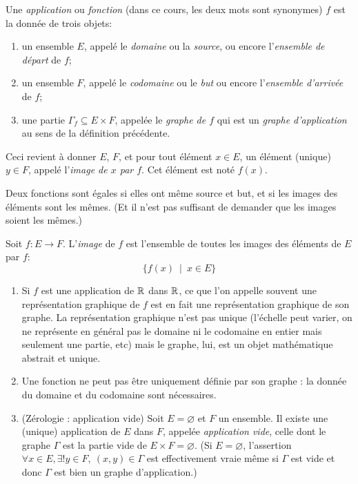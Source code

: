 \begin{definition}
Une \emph{application} ou \emph{fonction} (dans ce cours, les deux mots sont synonymes) $f$ est la donnée de trois objets:
\begin{enumerate}
\item un ensemble $E$, appelé le \emph{domaine} ou la \emph{source}, ou encore l'\emph{ensemble de départ} de $f$;
\item un ensemble $F$, appelé le \emph{codomaine} ou le \emph{but} ou encore l'\emph{ensemble d'arrivée} de $f$;
\item une partie $\Gamma_f \subseteq E\times F$, appelée le \emph{graphe de $f$} qui est un \emph{graphe d'application} au sens de la définition précédente. 
\end{enumerate}
Ceci revient à donner $E$, $F$, et pour tout élément $x \in E$, un élément (unique) $y\in F$, appelé l'\emph{image de $x$ par $f$}. Cet élément est noté $f(x)$.
\end{definition}

Deux fonctions sont égales si elles ont même source et but, et si les images des éléments sont les mêmes. (Et il n'est pas suffisant de demander que les images soient les mêmes.)

\begin{definition}
Soit $f : E\to F$. L'\emph{image} de $f$ est l'ensemble de toutes les images des éléments de $E$ par $f$:
\[
\{f(x)\:\mid\: x\in E\}
\]
\end{definition}

\begin{remarque}
\begin{enumerate}
\item Si $f$ est une application de $\mathbb{R}$ dans $\mathbb{R}$, ce que l'on appelle souvent une \og représentation graphique de $f$\fg{} est en fait une représentation graphique de son graphe. La représentation graphique n'est pas unique (l'échelle peut varier, on ne représente en général pas le domaine ni le codomaine en entier mais seulement une partie, etc) mais le graphe, lui, est un objet mathématique abstrait et unique.
\item Une fonction ne peut pas être uniquement définie par son graphe : la donnée du domaine et du codomaine sont nécessaires.
\item {} (Zérologie : application vide) Soit $E = \varnothing$ et $F$ un ensemble. Il existe une (unique) application de $E$ dans $F$, appelée \emph{application vide}, celle dont le graphe $\Gamma$ est la partie vide de $E\times F = \varnothing$. (Si $E=\varnothing$,  l'assertion \og $\forall x\in E, \exists! y\in F,\: (x,y)\in \Gamma$\fg{} est effectivement vraie même si $\Gamma$ est vide et donc $\Gamma$ est bien un graphe d'application.)
\end{enumerate}
\end{remarque}

